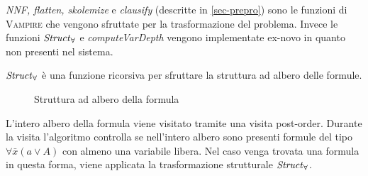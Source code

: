 \emph{NNF, flatten, skolemize} e \emph{clausify} (descritte in \ref{sec-prepro}) sono le funzioni di 
\textsc{Vampire} che vengono sfruttate per la trasformazione del problema.
Invece le funzioni $\text{\emph{Struct}}_\forall$ e \emph{computeVarDepth} vengono implementate ex-novo in quanto non presenti 
nel sistema. 

$\text{\emph{Struct}}_\forall$ è una funzione ricorsiva per sfruttare la struttura ad albero delle formule.
\begin{figure}[H]
    \caption{Struttura ad albero della formula}
\end{figure}
L'intero albero della formula viene visitato tramite una visita post-order. Durante la visita l'algoritmo 
controlla se nell'intero albero sono presenti formule del tipo $\forall \bar{x}(a \lor A)$ con almeno una variabile libera.
Nel caso venga trovata una formula in questa forma, viene applicata la trasformazione strutturale 
$\text{\emph{Struct}}_\forall$.

